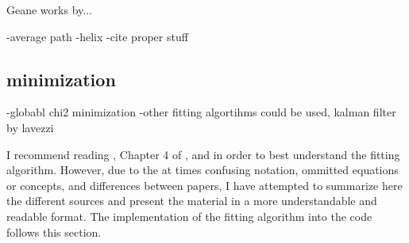 Geane works by...


-average path
-helix
-cite proper stuff





\subsection{\texorpdfstring{\chisq}{chisq} minimization}


-globabl chi2 minimization
-other fitting algortihms could be used, kalman filter by lavezzi



    I recommend reading \cite{geanemanual}, Chapter 4 of \cite{Lavezzi}, and \cite{trajfit} in order to best understand the fitting algorithm. However, due to the at times confusing notation, ommitted equations or concepts, and differences between papers, I have attempted to summarize here the different sources and present the material in a more understandable and readable format. The implementation of the fitting algorithm into the code follows this section.

